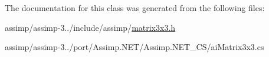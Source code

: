 The documentation for this class was generated from the following files\+:\begin{DoxyCompactItemize}
\item 
assimp/assimp-\/3../include/assimp/\hyperlink{matrix3x3_8h}{matrix3x3.\+h}\item 
assimp/assimp-\/3../port/\+Assimp.\+N\+E\+T/\+Assimp.\+N\+E\+T\+\_\+\+C\+S/ai\+Matrix3x3.\+cs\end{DoxyCompactItemize}
